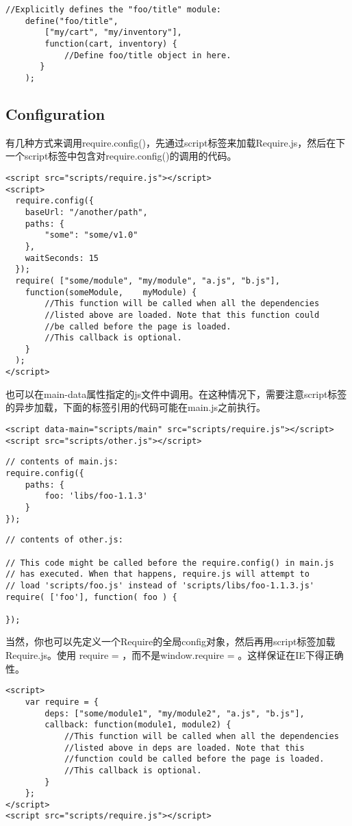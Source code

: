     \begin{lstlisting}
//Explicitly defines the "foo/title" module:
    define("foo/title",
        ["my/cart", "my/inventory"],
        function(cart, inventory) {
            //Define foo/title object in here.
       }
    );
    \end{lstlisting}

    \subsection{Configuration}

    有几种方式来调用require.config()，先通过script标签来加载Require.js，然后在下一个script标签中包含对require.config()的调用的代码。
    \begin{lstlisting}
<script src="scripts/require.js"></script>
<script>
  require.config({
    baseUrl: "/another/path",
    paths: {
        "some": "some/v1.0"
    },
    waitSeconds: 15
  });
  require( ["some/module", "my/module", "a.js", "b.js"],
    function(someModule,    myModule) {
        //This function will be called when all the dependencies
        //listed above are loaded. Note that this function could
        //be called before the page is loaded.
        //This callback is optional.
    }
  );
</script>
    \end{lstlisting}
    也可以在main-data属性指定的js文件中调用。在这种情况下，需要注意script标签的异步加载，下面的标签引用的代码可能在main.js之前执行。
    \begin{lstlisting}
<script data-main="scripts/main" src="scripts/require.js"></script>
<script src="scripts/other.js"></script>
    \end{lstlisting}
    \begin{lstlisting}
// contents of main.js:
require.config({
    paths: {
        foo: 'libs/foo-1.1.3'
    }
});
    \end{lstlisting}
    \begin{lstlisting}
// contents of other.js:

// This code might be called before the require.config() in main.js
// has executed. When that happens, require.js will attempt to
// load 'scripts/foo.js' instead of 'scripts/libs/foo-1.1.3.js'
require( ['foo'], function( foo ) {

});
    \end{lstlisting}

    当然，你也可以先定义一个Require的全局config对象，然后再用script标签加载Require.js。使用 require = {}，而不是window.require = {}。这样保证在IE下得正确性。

    \begin{lstlisting}
<script>
    var require = {
        deps: ["some/module1", "my/module2", "a.js", "b.js"],
        callback: function(module1, module2) {
            //This function will be called when all the dependencies
            //listed above in deps are loaded. Note that this
            //function could be called before the page is loaded.
            //This callback is optional.
        }
    };
</script>
<script src="scripts/require.js"></script>
    \end{lstlisting}


